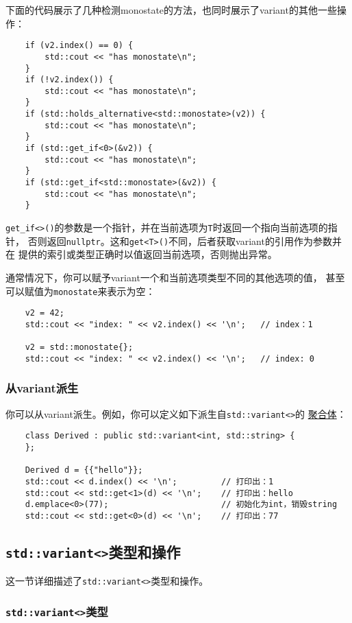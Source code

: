 下面的代码展示了几种检测monostate的方法，也同时展示了variant的其他一些操作：
\begin{lstlisting}
    if (v2.index() == 0) {
        std::cout << "has monostate\n";
    }
    if (!v2.index()) {
        std::cout << "has monostate\n";
    }
    if (std::holds_alternative<std::monostate>(v2)) {
        std::cout << "has monostate\n";
    }
    if (std::get_if<0>(&v2)) {
        std::cout << "has monostate\n";
    }
    if (std::get_if<std::monostate>(&v2)) {
        std::cout << "has monostate\n";
    }
\end{lstlisting}
\texttt{get\_if<>()}的参数是一个指针，并在当前选项为\texttt{T}时返回一个指向当前选项的指针，
否则返回\texttt{nullptr}。这和\texttt{get<T>()}不同，后者获取variant的引用作为参数并在
提供的索引或类型正确时以值返回当前选项，否则抛出异常。

通常情况下，你可以赋予variant一个和当前选项类型不同的其他选项的值，
甚至可以赋值为\texttt{monostate}来表示为空：
\begin{lstlisting}
    v2 = 42;
    std::cout << "index: " << v2.index() << '\n';   // index：1

    v2 = std::monostate{};
    std::cout << "index: " << v2.index() << '\n';   // index: 0
\end{lstlisting}

\subsubsection*{从variant派生}
你可以从variant派生。例如，你可以定义如下派生自\texttt{std::variant<>}的
\hyperref[ch4]{聚合体}：
\begin{lstlisting}
    class Derived : public std::variant<int, std::string> {
    };

    Derived d = {{"hello"}};
    std::cout << d.index() << '\n';         // 打印出：1
    std::cout << std::get<1>(d) << '\n';    // 打印出：hello
    d.emplace<0>(77);                       // 初始化为int，销毁string
    std::cout << std::get<0>(d) << '\n';    // 打印出：77
\end{lstlisting}

\subsection{\texttt{std::variant<>}类型和操作}
这一节详细描述了\texttt{std::variant<>}类型和操作。

\subsubsection{\texttt{std::variant<>}类型}

